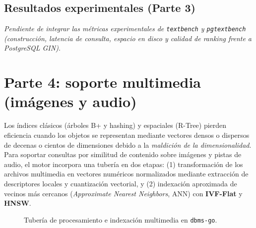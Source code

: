 \documentclass[11pt,a4paper]{article}
\begin{document}
\subsection{Resultados experimentales (Parte 3)}
\label{sec:exp-texto}

\emph{Pendiente de integrar las métricas experimentales de \texttt{textbench} y \texttt{pgtextbench} (construcción, latencia de consulta, espacio en disco y calidad de ranking frente a PostgreSQL GIN).}

\section{Parte 4: soporte multimedia (imágenes y audio)}
\label{sec:parte4}

Los índices clásicos (árboles B+ y hashing) y espaciales (R-Tree) pierden eficiencia cuando los objetos se representan mediante vectores densos o dispersos de decenas o cientos de dimensiones debido a la \emph{maldición de la dimensionalidad}. Para soportar consultas por similitud de contenido sobre imágenes y pistas de audio, el motor incorpora una tubería en dos etapas: (1) transformación de los archivos multimedia en vectores numéricos normalizados mediante extracción de descriptores locales y cuantización vectorial, y (2) indexación aproximada de vecinos más cercanos (\emph{Approximate Nearest Neighbors}, ANN) con \textbf{IVF-Flat} y \textbf{HNSW}.

\begin{figure}[H]
  \centering
  \caption{Tubería de procesamiento e indexación multimedia en \texttt{dbms-go}.}
  \label{fig:multimedia-pipeline}
\end{figure}
\end{document}
